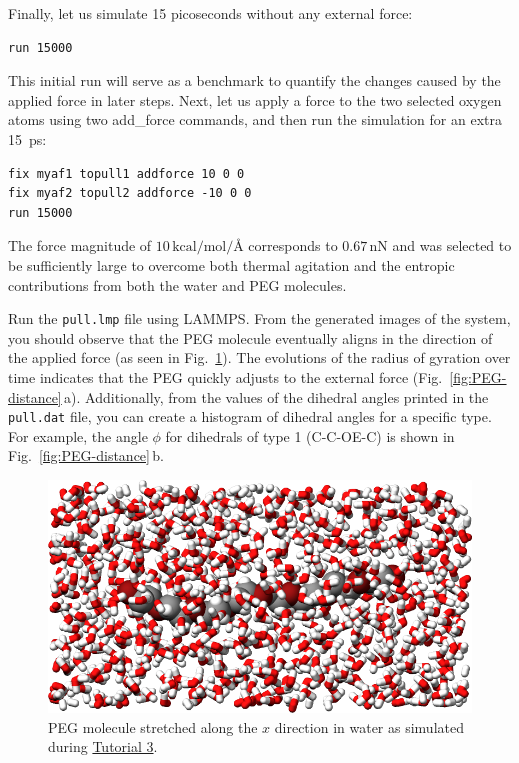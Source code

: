 \documentclass[9pt,tutorial]{livecoms}
\newcommand{\lmpcmd}[1]{\hspace{0pt}\colorbox{listing}{\textcolor{command}{\small{#1}}}\hspace{0pt}} %
\newcommand{\flecmd}[1]{\textcolor{command}{\texttt{#1}}} %
\begin{document}
Finally, let us simulate 15 picoseconds without any external force:
\begin{lstlisting}
run 15000
\end{lstlisting}
This initial run will serve as a benchmark to quantify the changes caused by
the applied force in later steps.  Next, let us apply a force to the two selected
oxygen atoms using two \lmpcmd{add\_force} commands, and then run the simulation
for an extra 15~ps:
\begin{lstlisting}
fix myaf1 topull1 addforce 10 0 0
fix myaf2 topull2 addforce -10 0 0
run 15000
\end{lstlisting}
The force magnitude of $10\,\text{kcal/mol/\AA{}}$ corresponds to $0.67\,\text{nN}$
and was selected to be sufficiently large to overcome both thermal agitation and
the entropic contributions from both the water and PEG molecules.

Run the \flecmd{pull.lmp} file using LAMMPS.  From the generated images of the system,
you should observe that the PEG molecule eventually aligns
in the direction of the applied force (as seen in Fig.~\ref{fig:PEG-in-water}).
The evolutions of the radius of gyration over
time indicates that the PEG quickly adjusts to the external force
(Fig.~\ref{fig:PEG-distance}\,a).  Additionally, from the values of the dihedral angles
printed in the \flecmd{pull.dat} file, you can create a histogram
of dihedral angles for a specific type.  For example, the angle $\phi$ for dihedrals
of type 1 (C-C-OE-C) is shown in Fig.~\ref{fig:PEG-distance}\,b.

\begin{figure}
\centering
\includegraphics[width=\linewidth]{PEG-in-water}
\caption{PEG molecule stretched along the $x$ direction in water
as simulated during \hyperref[all-atom-label]{Tutorial 3}.}
\label{fig:PEG-in-water}
\end{figure}
\end{document}
